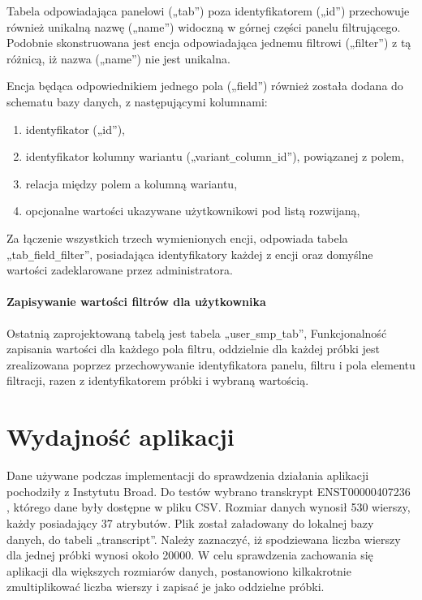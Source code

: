 \documentclass[a4paper,12pt,twoside]{article}
\begin{document}
Tabela odpowiadająca panelowi („tab”) poza identyfikatorem („id”) przechowuje również unikalną nazwę („name”) widoczną w górnej części panelu filtrującego.
Podobnie skonstruowana jest encja odpowiadająca jednemu filtrowi („filter”) z tą różnicą,
iż nazwa („name”) nie jest unikalna.

Encja będąca odpowiednikiem jednego pola („field”) również została dodana do schematu bazy danych,
z następującymi kolumnami:
\begin{enumerate}[1)]
\item identyfikator („id”),
\item identyfikator kolumny wariantu („variant\verb!_!column\verb!_!id”), powiązanej z polem,
\item relacja między polem a kolumną wariantu,
\item opcjonalne wartości ukazywane użytkownikowi pod listą rozwijaną,
\end{enumerate}

Za łączenie wszystkich trzech wymienionych encji, odpowiada tabela
„tab\verb!_!field\verb!_!filter”, posiadająca identyfikatory każdej z encji oraz
domyślne wartości zadeklarowane przez administratora.

\paragraph{Zapisywanie wartości filtrów dla użytkownika}
Ostatnią zaprojektowaną tabelą jest tabela „user\verb!_!smp\verb!_!tab”,
Funkcjonalność zapisania wartości dla każdego pola filtru, oddzielnie dla każdej próbki
jest zrealizowana poprzez przechowywanie identyfikatora panelu, filtru i pola elementu filtracji,
razen z identyfikatorem próbki i wybraną wartością.

\newpage
\section{Wydajność aplikacji}

Dane używane podczas implementacji do sprawdzenia działania aplikacji pochodziły
z Instytutu Broad.
Do testów wybrano transkrypt ENST00000407236 \cite{testData},
którego dane były dostępne w pliku CSV. Rozmiar danych wynosił 530 wierszy, każdy posiadający 37 atrybutów. Plik został załadowany do lokalnej bazy danych, do tabeli
„transcript”. Należy zaznaczyć, iż spodziewana liczba wierszy dla jednej próbki wynosi około 20000.
W celu sprawdzenia zachowania się aplikacji
dla większych rozmiarów danych, postanowiono kilkakrotnie zmultiplikować
liczba wierszy i zapisać je jako oddzielne próbki.
\end{document}
